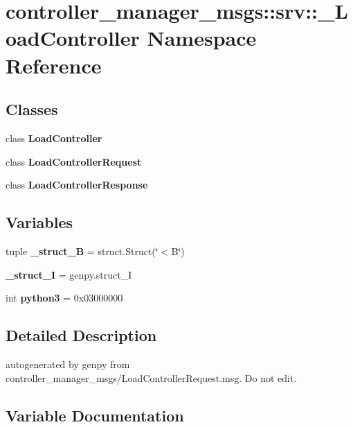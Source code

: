 \section{controller\-\_\-manager\-\_\-msgs\-:\-:srv\-:\-:\-\_\-\-Load\-Controller \-Namespace \-Reference}
\label{namespacecontroller__manager__msgs_1_1srv_1_1__LoadController}
\subsection*{\-Classes}
\begin{DoxyCompactItemize}
\item 
class {\bf \-Load\-Controller}
\item 
class {\bf \-Load\-Controller\-Request}
\item 
class {\bf \-Load\-Controller\-Response}
\end{DoxyCompactItemize}
\subsection*{\-Variables}
\begin{DoxyCompactItemize}
\item 
tuple {\bf \-\_\-struct\-\_\-\-B} = struct.\-Struct(\char`\"{}$<$\-B\char`\"{})
\item 
{\bf \-\_\-struct\-\_\-\-I} = genpy.\-struct\-\_\-\-I
\item 
int {\bf python3} = 0x03000000
\end{DoxyCompactItemize}


\subsection{\-Detailed \-Description}
\begin{DoxyVerb}autogenerated by genpy from controller_manager_msgs/LoadControllerRequest.msg. Do not edit.\end{DoxyVerb}
 

\subsection{\-Variable \-Documentation}

